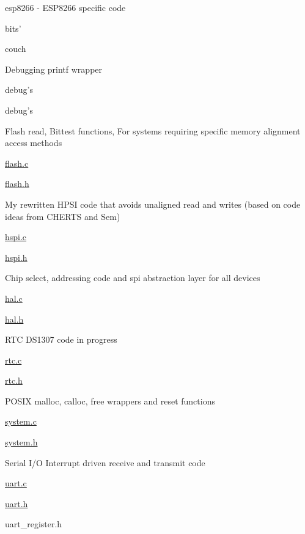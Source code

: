 esp8266 -\/ E\+S\+P8266 specific code
\begin{DoxyItemize}
\item bits’
\item couch
\item Debugging printf wrapper
\begin{DoxyItemize}
\item debug’s
\item debug’s
\end{DoxyItemize}
\item Flash read, Bittest functions, For systems requiring specific memory alignment access methods
\begin{DoxyItemize}
\item \hyperlink{flash_8c}{flash.\+c}
\item \hyperlink{flash_8h}{flash.\+h}
\end{DoxyItemize}
\item My rewritten H\+P\+SI code that avoids unaligned read and writes (based on code ideas from C\+H\+E\+R\+TS and Sem)
\begin{DoxyItemize}
\item \hyperlink{hspi_8c}{hspi.\+c}
\item \hyperlink{hspi_8h}{hspi.\+h}
\end{DoxyItemize}
\item Chip select, addressing code and spi abstraction layer for all devices
\begin{DoxyItemize}
\item \hyperlink{hal_8c}{hal.\+c}
\item \hyperlink{hal_8h}{hal.\+h}
\end{DoxyItemize}
\item R\+TC D\+S1307 code in progress
\begin{DoxyItemize}
\item \hyperlink{rtc_8c}{rtc.\+c}
\item \hyperlink{rtc_8h}{rtc.\+h}
\end{DoxyItemize}
\item P\+O\+S\+IX malloc, calloc, free wrappers and reset functions
\begin{DoxyItemize}
\item \hyperlink{system_8c}{system.\+c}
\item \hyperlink{system_8h}{system.\+h}
\end{DoxyItemize}
\item Serial I/O Interrupt driven receive and transmit code
\begin{DoxyItemize}
\item \hyperlink{uart_8c}{uart.\+c}
\item \hyperlink{uart_8h}{uart.\+h}
\item uart\+\_\+register.\+h
\end{DoxyItemize}
\end{DoxyItemize}

